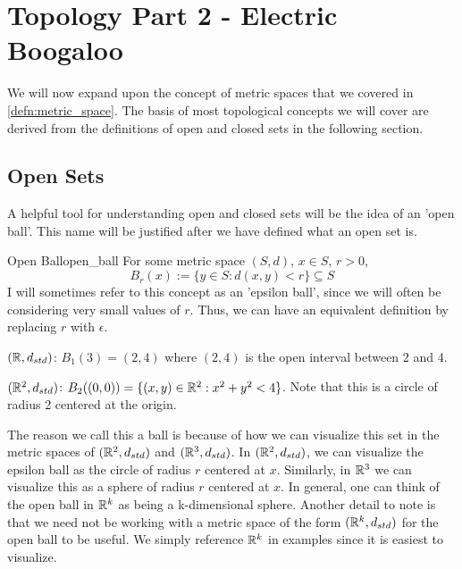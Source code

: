 \section{Topology Part 2 - Electric Boogaloo}
We will now expand upon the concept of metric spaces that we covered in \ref{defn:metric_space}. The basis of most topological concepts we will cover are derived from the  definitions of open and closed sets in the following section. 
\subsection{Open Sets}
A helpful tool for understanding open and closed sets will be the idea of an 'open ball'. This name will be justified after we have defined what an open set is.
\begin{defn}{Open Ball}{open_ball}
For some metric space \((S, d)\), \(x\in S\), \(r > 0\),
\begin{displaymath}
  B_r(x) := \{y \in S: d(x,y) < r\} \subseteq S
\end{displaymath}
I will sometimes refer to this concept as an 'epsilon ball', since we will often be considering very small values of \(r\). Thus, we can have an equivalent definition by replacing \(r\) with \(\epsilon\).
\end{defn}

\begin{exmp}{}{}
\(({\mathbb R}, d_{std})\): \(B_1(3) = (2,4)\) where \((2,4)\) is the open interval between 2 and 4.
\end{exmp}
\begin{exmp}{}{}
\(({\mathbb R}^2, d_{std})\): \(B_2((0, 0)) = \{(x, y) \in {\mathbb R}^2: x^2 + y^2 < 4\}\). Note that this is a circle of radius 2 centered at the origin.
\end{exmp}

The reason we call this a ball is because of how we can visualize this set in the metric spaces of \(({\mathbb R}^2,d_{std})\) and \(({\mathbb R}^3, d_{std})\). In \(({\mathbb R}^2,d_{std})\), we can visualize the epsilon ball as the circle of radius \(r\) centered at \(x\). Similarly, in \({\mathbb R}^3\) we can visualize this as a sphere of radius \(r\) centered at \(x\). In general, one can think of the open ball in \({\mathbb R}^k\) as being a k-dimensional sphere. Another detail to note is that we need not be working with a metric space of the form \(({\mathbb R}^k, d_{std})\) for the open ball to be useful. We simply reference \({\mathbb R}^k\) in examples since it is easiest to visualize. 
\newline

